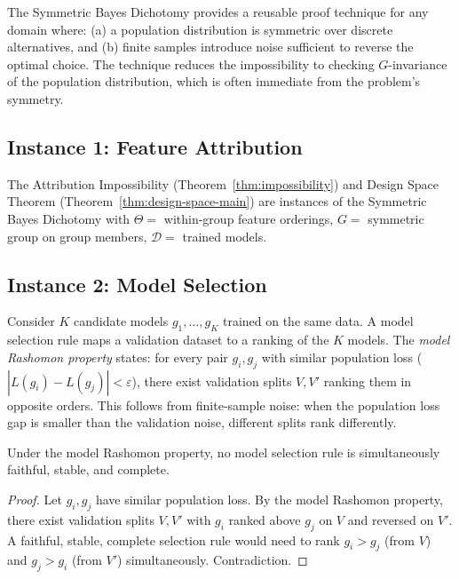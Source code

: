 \documentclass{jmlr}
\begin{document}
The Symmetric Bayes Dichotomy provides a reusable proof technique for any domain where: (a) a population distribution is symmetric over discrete alternatives, and (b) finite samples introduce noise sufficient to reverse the optimal choice. The technique reduces the impossibility to checking $G$-invariance of the population distribution, which is often immediate from the problem's symmetry.

\subsection{Instance 1: Feature Attribution}

\begin{corollary}
The Attribution Impossibility (Theorem~\ref{thm:impossibility}) and Design Space Theorem (Theorem~\ref{thm:design-space-main}) are instances of the Symmetric Bayes Dichotomy with $\Theta =$ within-group feature orderings, $G =$ symmetric group on group members, $\mathcal{D} =$ trained models.
\end{corollary}

\subsection{Instance 2: Model Selection}

Consider $K$ candidate models $g_1, \ldots, g_K$ trained on the same data. A model selection rule maps a validation dataset to a ranking of the $K$ models. The \emph{model Rashomon property} states: for every pair $g_i, g_j$ with similar population loss ($|L(g_i) - L(g_j)| < \varepsilon$), there exist validation splits $V, V'$ ranking them in opposite orders. This follows from finite-sample noise: when the population loss gap is smaller than the validation noise, different splits rank differently.

\begin{theorem}
\label{thm:model-selection}
Under the model Rashomon property, no model selection rule is simultaneously faithful, stable, and complete.
\end{theorem}

\begin{proof}
Let $g_i, g_j$ have similar population loss. By the model Rashomon property, there exist validation splits $V, V'$ with $g_i$ ranked above $g_j$ on $V$ and reversed on $V'$. A faithful, stable, complete selection rule would need to rank $g_i > g_j$ (from $V$) and $g_j > g_i$ (from $V'$) simultaneously. Contradiction.
\end{proof}
\end{document}
